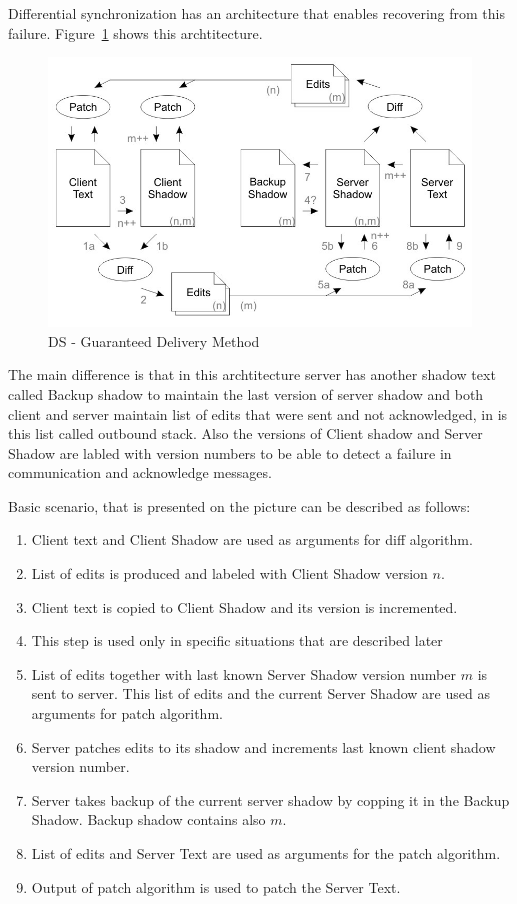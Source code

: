 \documentclass[12pt,oneside]{fithesis2}
\begin{document}
\par Differential synchronization has an architecture that enables recovering from this failure. Figure~\ref{fig:ds2} shows this archtitecture.
\begin{figure}[H]
\caption{DS - Guaranteed Delivery Method \cite{Fraser}}
\label{fig:ds2}
\centering
\vspace{5mm}
\includegraphics[scale=0.45]{diff2}
\end{figure}
\par The main difference is that in this archtitecture server has another shadow text called Backup shadow to maintain the last version of server shadow and both client and server maintain list of edits that were sent and not acknowledged, in \cite{Fraser} is this list called outbound stack. Also the versions of Client shadow and Server Shadow are labled with version numbers to be able to detect a failure in communication and acknowledge messages.
\par Basic scenario, that is presented on the picture can be described as follows:
\begin{enumerate}
\item Client text and Client Shadow are used as arguments for diff algorithm.
\item List of edits is produced and labeled with Client Shadow version \(n\).
\item Client text is copied to Client Shadow and its version is incremented.
\item This step is used only in specific situations that are described later
\item List of edits together with last known Server Shadow version number \(m\) is sent to server. This list of edits and the current Server Shadow are used as arguments for patch algorithm. 
\item Server patches edits to its shadow and increments last known client shadow version number.
\item Server takes backup of the current server shadow by copping it in the Backup Shadow. Backup shadow contains also \(m\).
\item List of edits and Server Text are used as arguments for the patch algorithm.
\item Output of patch algorithm is used to patch the Server Text.
\end{enumerate}
\end{document}
